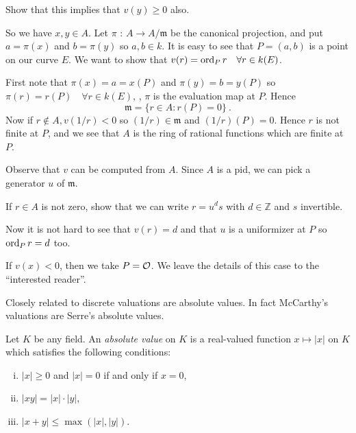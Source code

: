 \begin{exo}
\label{e2.8.12}
Show that this implies that $v(y)\geq 0$ also.
\end{exo}

So we have $x, y\in A$. Let $\pi$ : $A\rightarrow A/\mathfrak{m}$ be the canonical projection, and put $a=\pi(x)$ and $b=\pi(y)$ so $a,b\in k$. It is easy to see that $P=(a,b)$ is a point on our curve $E$. We want to show that $v(r)=\operatorname{ord}_{P}r \quad \forall r\in k(E)$.

First note that $\pi(x)=a=x(P)$ and $\pi(y)=b=y(P)$ so $\pi(r)=r(P)\quad \forall r\in k(E)$, \ie, $\pi$ is the evaluation map at $P$. Hence
$$
\mathfrak{m}=\{r\in A:r(P)=0\}\ .
$$
Now if $r\not\in A,v(1/r)<0$ so $(1/r)\in \mathfrak{m}$ and $(1/r)(P)=0$. Hence $r$ is not finite at $P$, and we see that $A$ is the ring of rational functions which are finite at $P$.

Observe that $v$ can be computed from $A$. Since $A$ is a pid, we can pick a generator $u$ of $\mathfrak{m}$.

\begin{exo}
\label{e2.8.13}
If $r\in A$ is not zero, show that we can write $r=u^{d}s$ with $d\in \mathbb{Z}$ and $s$ invertible.
\end{exo}

Now it is not hard to see that $v(r)=d$ and that $u$ is a uniformizer at $P$ so $\operatorname{ord}_{P}r=d$ too.

If $v(x)<0$, then we take $P=\mathcal{O}$. We leave the details of this case to the ``interested reader''.

Closely related to discrete valuations are absolute values. In fact McCarthy's valuations are Serre's absolute values.

\begin{defi}
\label{d2.8.17}
Let $K$ be any field. An {\it absolute value} on $K$ is a real-valued function $x\mapsto|x|$ on $K$ which satisfies the following conditions:
\begin{enumerate}[(i)]
\item
$|x|\geq 0$ and $|x|=0$ if and only if $x=0$,
\item
$|xy|=|x|\cdot|y|$,
\item
$|x+y|\displaystyle \leq\max(|x|,|y|)$.
\end{enumerate}
\end{defi}

